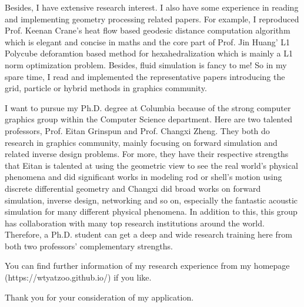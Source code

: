\documentclass[a4paper,12pt]{article}
\begin{document}
Besides, I have extensive research interest. I also have some experience in reading and implementing geometry processing related papers. For example, I reproduced Prof. Keenan Crane's heat flow based geodesic distance computation algorithm which is elegant and concise in maths and the core part of Prof. Jin Huang' L1 Polycube deforamtion based method for hexahedralization which is mainly a L1 norm optimization problem. Besides, fluid simulation is fancy to me! So in my spare time, I read and implemented the representative papers introducing the grid, particle or hybrid methods in graphics community. \vspace{1.2ex}

I want to pursue my Ph.D. degree at Columbia because of the strong computer graphics group within the Computer Science department. Here are two talented professors, Prof. Eitan Grinspun and Prof. Changxi Zheng. They both do research in graphics community, mainly focusing on forward simulation and related inverse design problems. For more, they have their respective strengths that Eitan is talented at using the geometric view to see the real world's physical phenomena and did significant works in modeling rod or shell's motion using discrete differential geometry and Changxi did broad works on forward simulation, inverse design, networking and so on, especially the fantastic acoustic simulation for many different physical phenomena. In addition to this, this group has collaboration with many top research institutions around the world. Therefore, a Ph.D. student can get a deep and wide research training here from both two professors' complementary strengths.\vspace{1.2ex} 

You can find further information of my research experience from my homepage\\(https://wtyatzoo.github.io/) if you like.\vspace{1.2ex}

Thank you for your consideration of my application.

\vspace{1.2ex}
\end{document}
